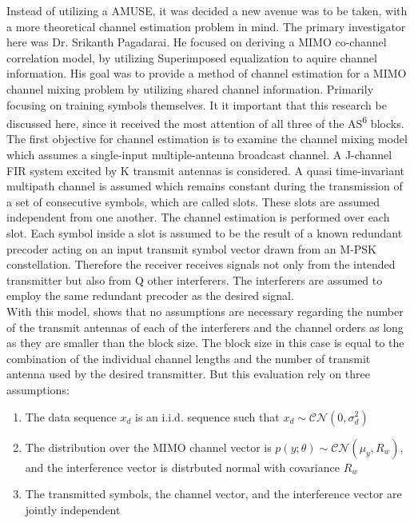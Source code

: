 Instead of utilizing a AMUSE, it was decided a new avenue was to be taken, with a more theoretical channel estimation problem in mind.  The primary investigator here was Dr. Srikanth Pagadarai.  He focused on deriving a MIMO co-channel correlation model, by utilizing Superimposed equalization to aquire channel information.  His goal was to provide a method of channel estimation for a MIMO channel mixing problem by utilizing shared channel information.  Primarily focusing on training symbols themselves.  It it important that this research be discussed here, since it received the most attention of all three of the AS\textsuperscript{6} blocks.\\

The first objective for channel estimation is to examine the channel mixing model which assumes a single-input multiple-antenna broadcast channel.  A J-channel FIR system excited by K transmit antennas is considered. A quasi time-invariant multipath channel is assumed which remains constant during the transmission of a set of consecutive symbols, which are called slots. These slots are assumed independent from one another.  The channel estimation is performed over each slot. Each symbol inside a slot is assumed to be the result of a known redundant precoder acting on an input transmit symbol vector drawn from an M-PSK constellation. Therefore the receiver receives signals not only from the intended transmitter but also from Q other interferers. The interferers are assumed to employ the same redundant precoder as the desired signal\cite{skrkantPHD}.\\

With this model, \cite{midterm_report} shows that no assumptions are necessary regarding the number of the transmit antennas of each of the interferers and the channel orders as long as they are smaller than the block size.  The block size in this case is equal to the combination of the individual channel lengths and the number of transmit antenna used by the desired transmitter.  But this evaluation rely on three assumptions:

\begin{enumerate}
\item The data sequence \(x_{d}\) is an i.i.d. sequence such that \(x_{d}\sim\mathcal{CN}(0,\sigma_{d}^{2})\)

\item The distribution over the MIMO channel vector is \(p(y;\theta)\sim\mathcal{CN}(\mu_{y},R_{w})\), and the interference vector is distrbuted normal with covariance \(R_{w}\)

\item The transmitted symbols, the channel vector, and the interference vector are jointly independent
\end{enumerate}

